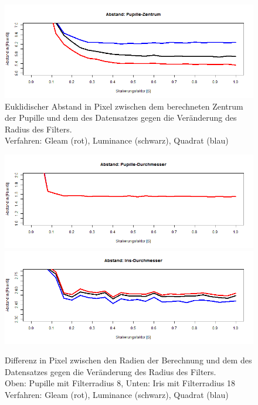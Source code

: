 \begin{figure}
	\centering
	\includegraphics[width=\linewidth]{Eye_Img_Box/Vergleich_Scal_A}
	\caption{Euklidischer Abstand in Pixel zwischen dem berechneten Zentrum der Pupille und dem des Datensatzes gegen die Veränderung des Radius des Filters.\\
		Verfahren: Gleam (rot), Luminance (schwarz),  Quadrat (blau)}
	\label{img_Vergleich_Scal_A}
\end{figure}
\begin{figure}
	\centering
	\includegraphics[width=\linewidth]{Eye_Img_Box/Vergleich_Scal_P}
	\includegraphics[width=\linewidth]{Eye_Img_Box/Vergleich_Scal_I}
	\caption{Differenz in Pixel zwischen den Radien der Berechnung und dem des Datensatzes gegen die Veränderung des Radius des Filters.\\ Oben: Pupille mit Filterradius 8, Unten: Iris mit Filterradius 18\\
		Verfahren: Gleam (rot), Luminance (schwarz), Quadrat (blau)}
	\label{img_Vergleich_Scal_PI}
\end{figure}
